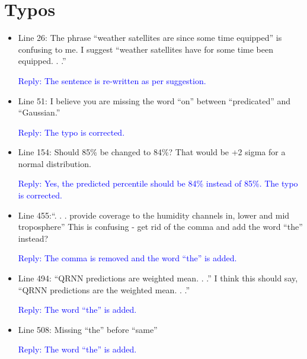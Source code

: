 \documentclass[11pt,a4paper]{article}
\begin{document}
\section*{Typos}
\begin{itemize}


\item Line 26: The phrase ``weather satellites are since some time equipped'' is confusing to
me. I suggest ``weather satellites have for some time been equipped. . .''

\textcolor{blue}{Reply: The sentence is re-written as per suggestion.}

\item Line 51: I believe you are missing the word ``on'' between ``predicated'' and ``Gaussian.''

\textcolor{blue}{Reply: The typo is corrected.}

\item Line 154: Should 85\% be changed to 84\%? That would be +2 sigma for a normal
distribution.

\textcolor{blue}{Reply: Yes, the predicted percentile should be 84\% instead of 85\%. The typo is corrected.} 


\item Line 455:``. . . provide coverage to the humidity channels in, lower and mid troposphere''
This is confusing - get rid of the comma and add the word ``the'' instead?

\textcolor{blue}{Reply: The comma is removed and the word ``the'' is added.}


\item Line 494:	``QRNN predictions are weighted mean. . .'' I think this should say, ``QRNN
predictions are the weighted mean. . .''

\textcolor{blue}{Reply: The word ``the'' is added.}



\item Line 508: Missing ``the'' before ``same''


\textcolor{blue}{Reply: The word ``the'' is added.}

\end{itemize}
	
\end{document}
